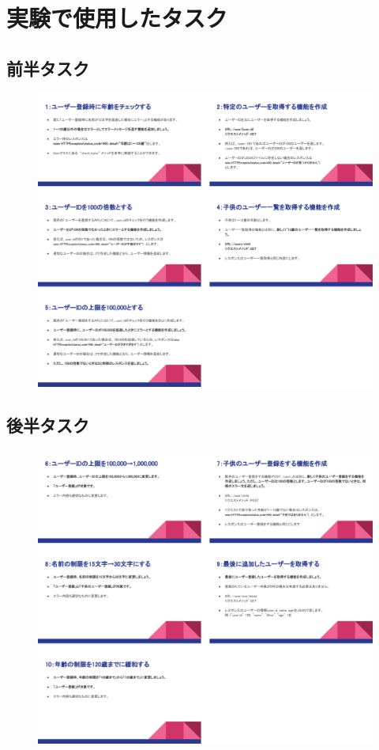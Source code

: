 \appendix
\chapter{実験で使用したタスク}

\section{前半タスク}
\begin{figure}[H]
    \centering
    \includegraphics[width=14cm]{images/taska.png}
\end{figure}

\section{後半タスク}
\begin{figure}[H]
    \centering
    \includegraphics[width=14cm]{images/taskb.png}
\end{figure}